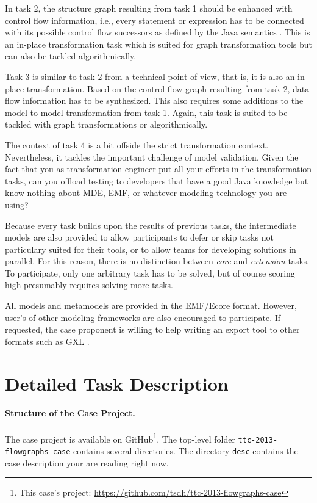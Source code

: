 \documentclass[11pt]{article}
\begin{document}
In task 2, the structure graph resulting from task 1 should be enhanced with
control flow information, i.e., every statement or expression has to be
connected with its possible control flow successors as defined by the Java
semantics \cite{Java7Spec}.  This is an in-place transformation task which is
suited for graph transformation tools but can also be tackled algorithmically.

Task 3 is similar to task 2 from a technical point of view, that is, it is also
an in-place transformation.  Based on the control flow graph resulting from
task 2, data flow information has to be synthesized.  This also requires some
additions to the model-to-model transformation from task 1.  Again, this task
is suited to be tackled with graph transformations or algorithmically.

The context of task 4 is a bit offside the strict transformation context.
Nevertheless, it tackles the important challenge of model validation.  Given
the fact that you as transformation engineer put all your efforts in the
transformation tasks, can you offload testing to developers that have a good
Java knowledge but know nothing about MDE, EMF, or whatever modeling technology
you are using?

Because every task builds upon the results of previous tasks, the intermediate
models are also provided to allow participants to defer or skip tasks not
particulary suited for their tools, or to allow teams for developing solutions
in parallel.  For this reason, there is no distinction between \emph{core} and
\emph{extension} tasks.  To participate, only one arbitrary task has to be
solved, but of course scoring high presumably requires solving more tasks.


All models and metamodels are provided in the EMF/Ecore format.  However,
user's of other modeling frameworks are also encouraged to participate.  If
requested, the case proponent is willing to help writing an export tool to
other formats such as GXL \cite{GXL02}.


\section{Detailed Task Description}
\label{sec:task-descr}

\paragraph{Structure of the Case Project.}

The case project is available on GitHub\footnote{This case's project:
  \url{https://github.com/tsdh/ttc-2013-flowgraphs-case}}. The top-level folder
\verb|ttc-2013-flowgraphs-case| contains several directories.  The directory
\verb|desc| contains the case description your are reading right now.
\end{document}
